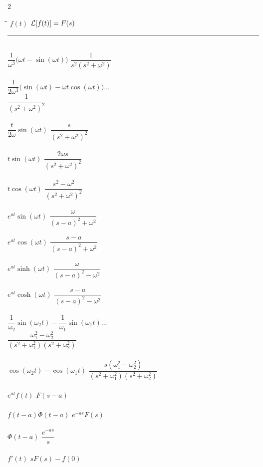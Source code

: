 \documentclass[12pt,letter]{article}
\begin{document}
{\begin{multicols}{2}
\columnbreak

\begin{center}
\begin{tabbing}
\hspace*{1.5in}\=\hspace{1.5in}\= \kill
	$f(t)$ \> $\mathcal{L}{\left[f(t)\right]}=F(s)$ \> \\ \noindent\rule{8.0cm}{0.4pt} \\
	$\dfrac{1}{\omega^3}\big(\omega t - \sin(\omega t)\big) $	\> $\dfrac{1}{s^2(s^2+\omega^2)}$	\>\LTNUM \\ \\
	$\dfrac{1}{2\omega^3}\big(\sin(\omega t) - \omega t \cos(\omega t)\big) \dots $	\\ \> $\dfrac{1}{(s^2+\omega^2)^2}$	\>\LTNUM \\ \\
	$\dfrac{t}{2\omega} \sin(\omega t)$	 \> $\dfrac{s}{(s^2+\omega^2)^2}$	\>\LTNUM \\ \\
	$t\sin (\omega t) $  	\> $\dfrac{2\omega s}{(s^2+\omega^2)^2}$ \>\LTNUM \\ \\
	$t\cos (\omega t) $  	\> $\dfrac{s^2-\omega^2}{(s^2+\omega^2)^2}$ \>\LTNUM \\ \\
	$e^{at}\sin (\omega t) $	\> $\dfrac{\omega}{(s-a)^2+\omega^2}$  \>\LTNUM \\ \\
	$e^{at}\cos (\omega t) $	\> $\dfrac{s-a}{(s-a)^2+\omega^2}$  \>\LTNUM \\ \\
	$e^{at}\sinh (\omega t) $	\> $\dfrac{\omega}{(s-a)^2-\omega^2}$  \>\LTNUM \\ \\
	$e^{at}\cosh (\omega t) $	\> $\dfrac{s-a}{(s-a)^2-\omega^2}$  \>\LTNUM \\ \\
	$\dfrac{1}{\omega_2}\sin(\omega_2 t) - \dfrac{1}{\omega_1}\sin (\omega_1 t) \dots $	 \\ \> $\dfrac{\omega_1^2-\omega_2^2}{(s^2+\omega_1^2)(s^2+\omega_2^2)}$	\>\LTNUM \\ \\
	$\cos(\omega_2 t) - \cos (\omega_1 t)  $	\> $\dfrac{s(\omega_1^2-\omega_2^2)}{(s^2+\omega_1^2)(s^2+\omega_2^2)}$	\>\LTNUM \\ \\
	$e^{at}f(t)$	\> $F(s-a)$	\>\LTNUM \\ \\ 
	$f(t-a)\Phi(t-a)$ \> $e^{-as}F(s)$ \>\LTNUM \\ \\
	$\Phi(t-a)$ \> $\dfrac{e^{-as}}{s}$ \>\LTNUM \\ \\
	$f'(t)$ 	\> $sF(s) - f(0)$ \>\LTNUM \\ \\
\end{tabbing}
\end{center}
\end{multicols}
}
\end{document}
